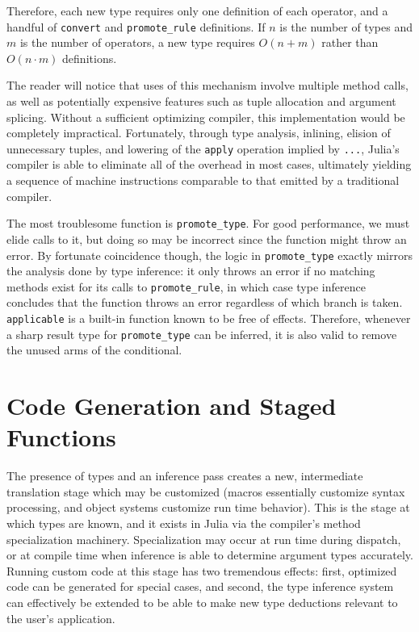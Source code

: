 Therefore, each new type requires only one definition of each operator,
and a handful of {\tt convert} and {\tt promote\_rule} definitions.
If $n$ is the number of types and $m$ is the number of operators, a new
type requires $O(n+m)$ rather than $O(n\cdot m)$ definitions.

The reader will notice that uses of this mechanism involve multiple method
calls, as well as potentially expensive features such as tuple allocation
and argument splicing. Without a sufficient optimizing compiler, this
implementation would be completely impractical. Fortunately, through
type analysis, inlining, elision of unnecessary tuples, and lowering of
the {\tt apply} operation implied by {\tt ...}, Julia's compiler is able
to eliminate all of the overhead in most cases, ultimately yielding a
sequence of machine instructions comparable to that emitted by a
traditional compiler.

The most troublesome function is {\tt promote\_type}. For good performance,
we must elide calls to it, but doing so may be incorrect since the function
might throw an error. By fortunate coincidence though, the logic in
{\tt promote\_type} exactly mirrors the analysis done by type inference: it
only throws an error if no matching methods exist for its calls to
{\tt promote\_rule}, in which case type inference concludes that the
function throws an error regardless of which branch is taken.
{\tt applicable} is a built-in function known to be free of effects.
Therefore, whenever a sharp result type for {\tt promote\_type} can be
inferred, it is also valid to remove the unused arms of the conditional.


\section{Code Generation and Staged Functions}

The presence of types and an inference pass creates a new, intermediate
translation stage which may be customized (macros essentially customize
syntax processing, and object systems customize run time behavior).
This is the stage at which types are known, and it exists in Julia via
the compiler's method specialization machinery. Specialization may occur
at run time during dispatch, or at compile time when inference is able
to determine argument types accurately.
Running custom code at this stage has two tremendous effects:
first, optimized code can be generated for special cases, and
second, the type inference system can effectively be extended to be able to
make new type deductions relevant to the user's application.

